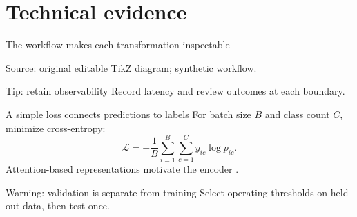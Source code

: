 \documentclass[11pt,aspectratio=169]{beamer}
\begin{document}
\section{Technical evidence}
\begin{frame}{The workflow makes each transformation inspectable}
  \centering
  \par\medskip
  \raggedright\small Source: original editable TikZ diagram; synthetic workflow.
  \begin{exampleblock}{Tip: retain observability}
    Record latency and review outcomes at each boundary.
  \end{exampleblock}
\end{frame}
\begin{frame}{A simple loss connects predictions to labels}
  For batch size $B$ and class count $C$, minimize cross-entropy:
  \begin{equation}
    \mathcal{L}=-\frac{1}{B}\sum_{i=1}^{B}\sum_{c=1}^{C}
      y_{ic}\log p_{ic}.
    \label{eq:deck-loss}
  \end{equation}
  Attention-based representations motivate the encoder
  \citep{vaswani2017attention}.
  \begin{alertblock}{Warning: validation is separate from training}
    Select operating thresholds on held-out data, then test once.
  \end{alertblock}
\end{frame}
\end{document}
